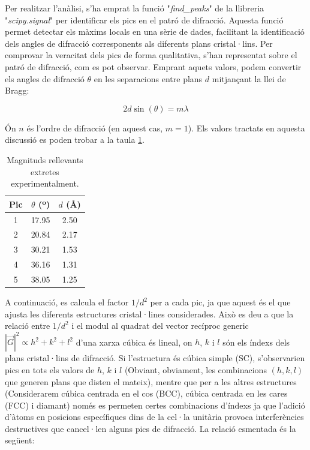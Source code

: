 \documentclass[a4paper, 11pt]{article}
\begin{document}
\noindent Per realitzar l'anàlisi, s'ha emprat la funció "\textit{find\_peaks}" de la llibreria "\textit{scipy.signal}" per identificar els pics en el patró de difracció. Aquesta funció permet detectar els màxims locals en una sèrie de dades, facilitant la identificació dels angles de difracció corresponents als diferents plans cristal·lins. Per comprovar la veracitat dels pics de forma qualitativa, s'han representat sobre el patró de difracció, com es pot observar. Emprant aquets valors, podem convertir els angles de difracció $\theta$ en les separacions entre plans $d$ mitjançant la llei de Bragg:

\begin{equation}
    2d\sin(\theta) = m\lambda
\end{equation}

\noindent Ón $n$ és l'ordre de difracció (en aquest cas, $m=1$). Els valors tractats en aquesta discussió es poden trobar a la taula \ref{tab:valors}.

\begin{table}[h!]
    \centering
    \begin{tabular}{|c|c|c|}
        \hline
        Pic & $\theta$ (º) & $d$ (\AA) \\
        \hline
        1 & 17.95 & 2.50 \\
        2 & 20.84 & 2.17 \\
        3 & 30.21 & 1.53 \\
        4 & 36.16 & 1.31 \\
        5 & 38.05 & 1.25 \\
        \hline
    \end{tabular}
    \caption{Magnituds rellevants extretes experimentalment.}
    \label{tab:valors}
\end{table}

\noindent A continuació, es calcula el factor $1/d^2$ per a cada pic, ja que aquest és el que ajusta les diferents estructures cristal·lines considerades. Això es deu a que la relació entre $1/d^2$ i el modul al quadrat del vector recíproc generic $|\vec{G}|^2 \propto h^2 + k^2 + l^2$ d'una xarxa cúbica és lineal, on $h$, $k$ i $l$ són els índexs dels plans cristal·lins de difracció. Si l'estructura és cúbica simple (SC), s'observarien pics en tots els valors de $h$, $k$ i $l$ (Obviant, obviament, les combinacions $(h,k,l)$ que generen plans que disten el mateix), mentre que per a les altres estructures (Considerarem cúbica centrada en el cos (BCC), cúbica centrada en les cares (FCC) i diamant) només es permeten certes combinacions d'índexs ja que l'adició d'àtoms en posicions específiques dins de la cel·la unitària provoca interferències destructives que cancel·len alguns pics de difracció. La relació esmentada és la següent:
\end{document}
